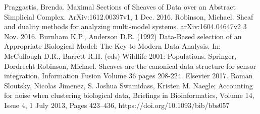 \documentclass[10.5pt]{article}
\begin{document}

 \newpage
 
 \begin{thebibliography}{widestlabel}
Praggastis, Brenda. Maximal Sections of Sheaves of Data over an Abstract Simplicial Complex. ArXiv:1612.00397v1, 1 Dec. 2016.
Robinson, Michael. Sheaf and duality methods for analyzing
multi-model systems. arXiv:1604.04647v2 3 Nov. 2016.
Burnham K.P., Anderson D.R. (1992) Data-Based selection of an Appropriate Biological Model: The Key to Modern Data Analysis. In: McCullough D.R., Barrett R.H. (eds) Wildlife 2001: Populations. Springer, Dordrecht
	Robinson, Michael. Sheaves are the canonical data structure for sensor integration. Information Fusion Volume 36 pages 208-224. Elsevier 2017.
Roman Sloutsky, Nicolas Jimenez, S. Joshua Swamidass, Kristen M. Naegle; Accounting for noise when clustering biological data, Briefings in Bioinformatics, Volume 14, Issue 4, 1 July 2013, Pages 423–436, https://doi.org/10.1093/bib/bbs057


 \end{thebibliography}


\end{document}
